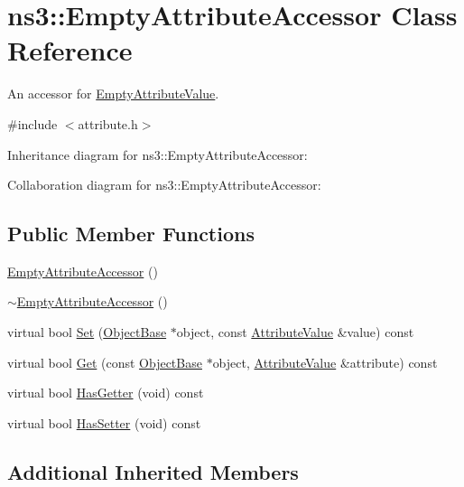 \hypertarget{classns3_1_1EmptyAttributeAccessor}{}\section{ns3\+:\+:Empty\+Attribute\+Accessor Class Reference}
\label{classns3_1_1EmptyAttributeAccessor}


An accessor for \hyperlink{classns3_1_1EmptyAttributeValue}{Empty\+Attribute\+Value}.  




{\ttfamily \#include $<$attribute.\+h$>$}



Inheritance diagram for ns3\+:\+:Empty\+Attribute\+Accessor\+:


Collaboration diagram for ns3\+:\+:Empty\+Attribute\+Accessor\+:
\subsection*{Public Member Functions}
\begin{DoxyCompactItemize}
\item 
\hyperlink{classns3_1_1EmptyAttributeAccessor_afe3b1536d536ca753fe4c30f639edf35}{Empty\+Attribute\+Accessor} ()
\item 
\hyperlink{classns3_1_1EmptyAttributeAccessor_afd5392aa5014af5e4fc9fbd794134e58}{$\sim$\+Empty\+Attribute\+Accessor} ()
\item 
virtual bool \hyperlink{classns3_1_1EmptyAttributeAccessor_a7b7ad3c4080687a695eb74ab1492d271}{Set} (\hyperlink{classns3_1_1ObjectBase}{Object\+Base} $\ast$object, const \hyperlink{classns3_1_1AttributeValue}{Attribute\+Value} \&value) const 
\item 
virtual bool \hyperlink{classns3_1_1EmptyAttributeAccessor_a33e1547de5653bfbacf870bd3caf805c}{Get} (const \hyperlink{classns3_1_1ObjectBase}{Object\+Base} $\ast$object, \hyperlink{classns3_1_1AttributeValue}{Attribute\+Value} \&attribute) const 
\item 
virtual bool \hyperlink{classns3_1_1EmptyAttributeAccessor_a2db3e504d4a42e4a3ce2c3d298b1fb84}{Has\+Getter} (void) const 
\item 
virtual bool \hyperlink{classns3_1_1EmptyAttributeAccessor_a847990d1ae24d952ab3c3b3a5a43664c}{Has\+Setter} (void) const 
\end{DoxyCompactItemize}
\subsection*{Additional Inherited Members}


